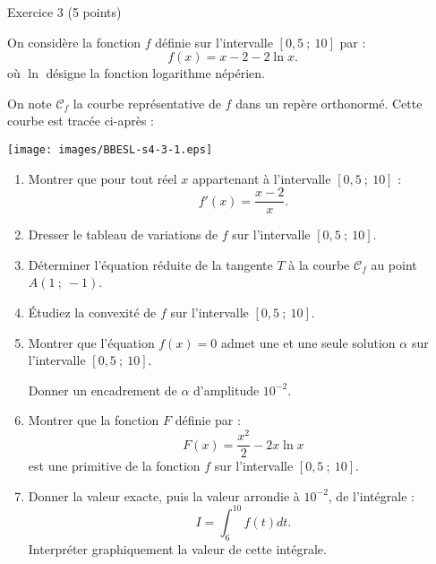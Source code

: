 
%
\begin{h2}Exercice 3 (5 points)\end{h2}
\par
On considère la fonction $f$ définie sur l'intervalle $[0,5~;~10]$ par :
\[ f(x)=x-2-2\ln x. \]
où $\ln$ désigne la fonction logarithme népérien.
\par
On note $\mathscr{C}_f$ la courbe représentative de $f$ dans un repère orthonormé. Cette courbe est tracée ci-après :

\begin{center}
\end{center}
\begin{center}
     \begin{extern}%
          \texttt{[image: images/BBESL-s4-3-1.eps]}%
     \end{extern}
\end{center}
\par
\begin{enumerate}
     \item %
     Montrer que pour tout réel $x$ appartenant à l'intervalle $[0,5~;~10]$ :
     \[ f'(x) =\dfrac{x-2}{x}. \]
     \item %
     Dresser le tableau de variations de $f$ sur l'intervalle $[0,5~;~10]$.
     \item %
     Déterminer l'équation réduite de la tangente $T$ à la courbe $\mathscr{C}_f$ au point $A(1~;~-1)$.
     \item %
     \'Etudiez la convexité de $f$ sur l'intervalle $[0,5~;~10]$.
     \item %
     Montrer que l'équation $f(x)=0$ admet une et une seule solution $\alpha$ sur l'intervalle $[0,5~;~10]$.
     \par
     Donner un encadrement de $\alpha$ d'amplitude $10^{-2}$.
     \item %
     Montrer que la fonction $F$ définie par :
     \[ F(x)=\dfrac{x^2}{2} - 2x\ln x \]
     est une primitive de la fonction $f$ sur l'intervalle $[0,5~;~10]$.
     \item %
     Donner la valeur exacte, puis la valeur arrondie à $10^{-2}$, de l'intégrale :
     \[ I=\displaystyle\int_{6}^{10} f(t)dt. \]
     Interpréter graphiquement la valeur de cette intégrale.
     \par
\end{enumerate}
